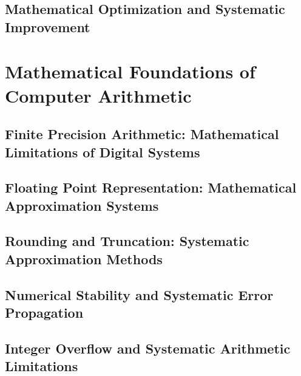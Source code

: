 \documentclass[12pt, oneside, openany]{book}
\begin{document}
\section{Mathematical Optimization and Systematic Improvement}


\chapter{Mathematical Foundations of Computer Arithmetic}

\section{Finite Precision Arithmetic: Mathematical Limitations of Digital Systems}

\section{Floating Point Representation: Mathematical Approximation Systems}

\section{Rounding and Truncation: Systematic Approximation Methods}

\section{Numerical Stability and Systematic Error Propagation}

\section{Integer Overflow and Systematic Arithmetic Limitations}
\end{document}
